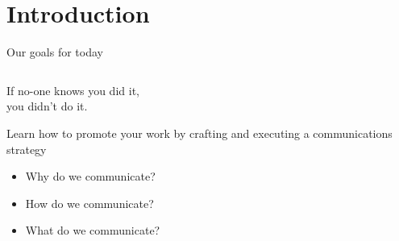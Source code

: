 \section{Introduction}
\label{sec:introduction}

\begin{frame}{Our goals for today}
    
    \begin{columns}[c]
        \begin{column}{.45\textwidth}
        
          \begin{center}
              \large{If no-one knows you did it,\\%
              you didn't do it.}
          \end{center}
        
        \vspace{1cm}
        Learn how to promote your work by crafting and executing a communications strategy
        
            \begin{itemize}
                \item Why do we communicate?
                \item How do we communicate?
                \item What do we communicate?
            \end{itemize}
        \end{column}
        

\end{columns}
\end{frame}
